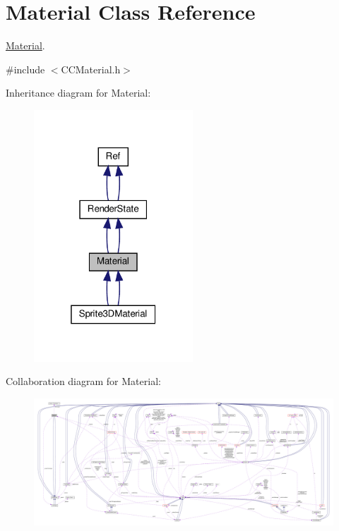 \hypertarget{classMaterial}{}\section{Material Class Reference}
\label{classMaterial}


\hyperlink{classMaterial}{Material}.  




{\ttfamily \#include $<$C\+C\+Material.\+h$>$}



Inheritance diagram for Material\+:
\nopagebreak
\begin{figure}[H]
\begin{center}
\leavevmode
\includegraphics[width=169pt]{classMaterial__inherit__graph}
\end{center}
\end{figure}


Collaboration diagram for Material\+:
\nopagebreak
\begin{figure}[H]
\begin{center}
\leavevmode
\includegraphics[width=350pt]{classMaterial__coll__graph}
\end{center}
\end{figure}
